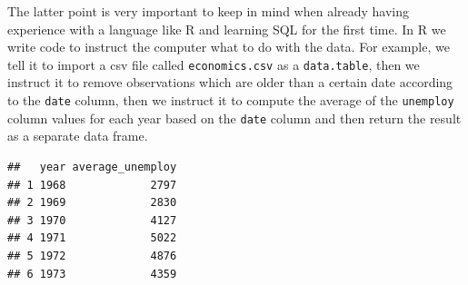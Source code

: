\documentclass[
  12pt,
]{style/krantz}
\newenvironment{Shaded}{\begin{snugshade}}{\end{snugshade}}
\newcommand{\AttributeTok}[1]{\textcolor[rgb]{0.77,0.63,0.00}{#1}}
\newcommand{\CommentTok}[1]{\textcolor[rgb]{0.56,0.35,0.01}{\textit{#1}}}
\newcommand{\ControlFlowTok}[1]{\textcolor[rgb]{0.13,0.29,0.53}{\textbf{#1}}}
\newcommand{\FunctionTok}[1]{\textcolor[rgb]{0.00,0.00,0.00}{#1}}
\newcommand{\NormalTok}[1]{#1}
\newcommand{\OtherTok}[1]{\textcolor[rgb]{0.56,0.35,0.01}{#1}}
\newcommand{\SpecialCharTok}[1]{\textcolor[rgb]{0.00,0.00,0.00}{#1}}
\newcommand{\StringTok}[1]{\textcolor[rgb]{0.31,0.60,0.02}{#1}}
\begin{document}
The latter point is very important to keep in mind when already having experience with a language like R and learning SQL for the first time. In R we write code to instruct the computer what to do with the data. For example, we tell it to import a csv file called \texttt{economics.csv} as a \texttt{data.table}, then we instruct it to remove observations which are older than a certain date according to the \texttt{date} column, then we instruct it to compute the average of the \texttt{unemploy} column values for each year based on the \texttt{date} column and then return the result as a separate data frame.

\begin{Shaded}
\end{Shaded}

\begin{verbatim}
##   year average_unemploy
## 1 1968             2797
## 2 1969             2830
## 3 1970             4127
## 4 1971             5022
## 5 1972             4876
## 6 1973             4359
\end{verbatim}
\end{document}
